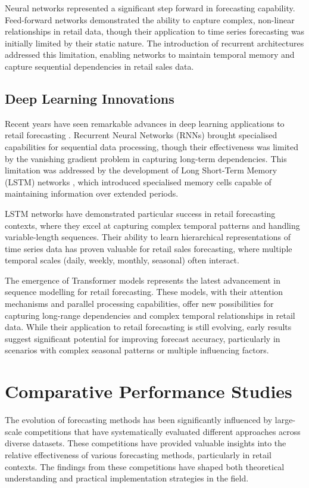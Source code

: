 \documentclass[12pt,a4paper]{report}
\begin{document}
Neural networks represented a significant step forward in forecasting capability. Feed-forward networks demonstrated the ability to capture complex, non-linear relationships in retail data, though their application to time series forecasting was initially limited by their static nature. The introduction of recurrent architectures addressed this limitation, enabling networks to maintain temporal memory and capture sequential dependencies in retail sales data.

\subsection{Deep Learning Innovations}

Recent years have seen remarkable advances in deep learning applications to retail forecasting \citep{vaswani2017attention}. Recurrent Neural Networks (RNNs) brought specialised capabilities for sequential data processing, though their effectiveness was limited by the vanishing gradient problem in capturing long-term dependencies. This limitation was addressed by the development of Long Short-Term Memory (LSTM) networks \citep{wu2020deep}, which introduced specialised memory cells capable of maintaining information over extended periods.

LSTM networks have demonstrated particular success in retail forecasting contexts, where they excel at capturing complex temporal patterns and handling variable-length sequences. Their ability to learn hierarchical representations of time series data has proven valuable for retail sales forecasting, where multiple temporal scales (daily, weekly, monthly, seasonal) often interact.

The emergence of Transformer models represents the latest advancement in sequence modelling for retail forecasting. These models, with their attention mechanisms and parallel processing capabilities, offer new possibilities for capturing long-range dependencies and complex temporal relationships in retail data. While their application to retail forecasting is still evolving, early results suggest significant potential for improving forecast accuracy, particularly in scenarios with complex seasonal patterns or multiple influencing factors.

\section{Comparative Performance Studies}

The evolution of forecasting methods has been significantly influenced by large-scale competitions that have systematically evaluated different approaches across diverse datasets. These competitions have provided valuable insights into the relative effectiveness of various forecasting methods, particularly in retail contexts. The findings from these competitions have shaped both theoretical understanding and practical implementation strategies in the field.
\end{document}
